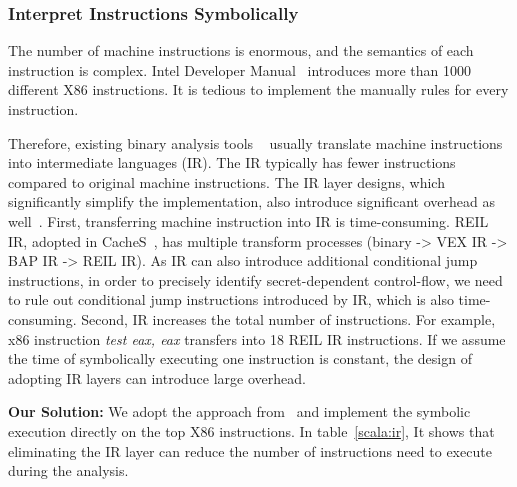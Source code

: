 \subsubsection{Interpret Instructions Symbolically}

The number of machine instructions is enormous, and the semantics of each instruction is complex. 
Intel Developer Manual~\cite{intelsys}
introduces more than 1000 different X86 instructions. 
It is tedious to implement the manually
rules for every instruction.

Therefore, existing binary analysis tools 
~\cite{shoshitaishvili2016state, 10.1007/978-3-642-22110-1_37} 
usually translate machine instructions into intermediate languages (IR). 
The IR typically has fewer instructions compared to original machine instructions. 
The IR layer designs, which significantly
simplify the implementation, also introduce significant overhead as well~\cite{217563}. First, transferring machine
instruction into IR is time-consuming. REIL IR, adopted in
CacheS~\cite{236338}, has multiple transform processes (binary -> VEX IR -> BAP IR -> REIL IR).
As IR can also introduce additional conditional jump instructions,
in order to precisely identify secret-dependent control-flow,
we need to rule out conditional jump instructions introduced by
IR, which is also time-consuming. Second, IR increases the total
number of instructions. For example, x86 instruction \textit{test eax, eax} 
transfers into 18 REIL IR instructions. If we assume the time of symbolically executing 
one instruction is constant, the design of adopting IR layers can introduce large overhead. 

\vspace*{2pt}
\textbf{Our Solution:}
We adopt the approach from~\cite{217563} and implement the symbolic execution 
directly on the top X86 instructions. In table~\ref{scala:ir}, 
It shows that eliminating the IR layer can reduce the number
of instructions need to execute during the analysis.

